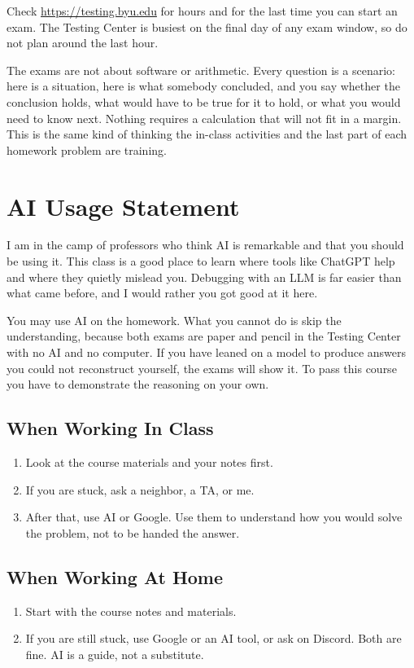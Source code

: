\documentclass[11pt]{article}
\begin{document}
Check \url{https://testing.byu.edu} for hours and for the last time you can start an exam. The
Testing Center is busiest on the final day of any exam window, so do not plan around the last
hour.

The exams are not about software or arithmetic. Every question is a scenario: here is a situation,
here is what somebody concluded, and you say whether the conclusion holds, what would have to be
true for it to hold, or what you would need to know next. Nothing requires a calculation that will
not fit in a margin. This is the same kind of thinking the in-class activities and the last part
of each homework problem are training.

\section*{AI Usage Statement}

I am in the camp of professors who think AI is remarkable and that you should be using it. This
class is a good place to learn where tools like ChatGPT help and where they quietly mislead you.
Debugging with an LLM is far easier than what came before, and I would rather you got good at it
here.

You may use AI on the homework. What you cannot do is skip the understanding, because both exams
are paper and pencil in the Testing Center with no AI and no computer. If you have leaned on a
model to produce answers you could not reconstruct yourself, the exams will show it. To pass this
course you have to demonstrate the reasoning on your own.

\subsection*{When Working In Class}
\begin{enumerate}[topsep=2pt,itemsep=1pt]
\item Look at the course materials and your notes first.
\item If you are stuck, ask a neighbor, a TA, or me.
\item After that, use AI or Google. Use them to understand how you would solve the problem, not
  to be handed the answer.
\end{enumerate}

\subsection*{When Working At Home}
\begin{enumerate}[topsep=2pt,itemsep=1pt]
\item Start with the course notes and materials.
\item If you are still stuck, use Google or an AI tool, or ask on Discord. Both are fine. AI is a
  guide, not a substitute.
\end{enumerate}
\end{document}
